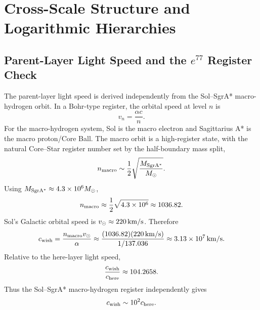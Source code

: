 \documentclass[11pt,a4paper]{article}
\begin{document}

\section{Cross-Scale Structure and Logarithmic Hierarchies}


\subsection{Parent-Layer Light Speed and the \(e^{77}\) Register Check}
\label{sec:wish_light_speed}

The parent-layer light speed is derived independently from the Sol--SgrA* macro-hydrogen orbit. In a Bohr-type register, the orbital speed at level \(n\) is
\[
v_n=\frac{\alpha c}{n}.
\]
For the macro-hydrogen system, Sol is the macro electron and Sagittarius A* is the macro proton/Core Ball. The macro orbit is a high-register state, with the natural Core--Star register number set by the half-boundary mass split,
\[
n_{\rm macro}
\sim
\frac12\sqrt{\frac{M_{\rm SgrA^*}}{M_\odot}}.
\]
Using \(M_{\rm SgrA^*}\approx4.3\times10^6M_\odot\),
\[
n_{\rm macro}
\approx
\frac12\sqrt{4.3\times10^6}
\approx
1036.82.
\]
Sol's Galactic orbital speed is \(v_\odot\approx220\,{\rm km/s}\). Therefore
\[
c_{\rm wish}
=
\frac{n_{\rm macro}v_\odot}{\alpha}
\approx
\frac{(1036.82)(220\,{\rm km/s})}{1/137.036}
\approx
3.13\times10^7\,{\rm km/s}.
\]
Relative to the here-layer light speed,
\[
\frac{c_{\rm wish}}{c_{\rm here}}
\approx
104.2658.
\]
Thus the Sol--SgrA* macro-hydrogen register independently gives
\[
c_{\rm wish}
\sim
10^2c_{\rm here}.
\]
\end{document}

